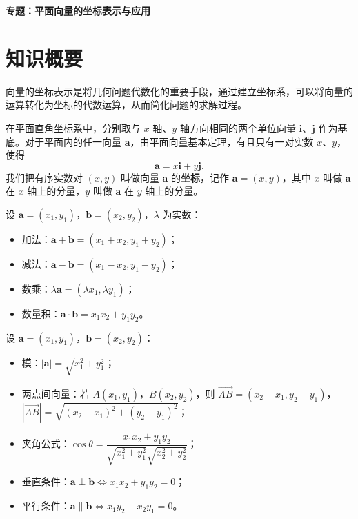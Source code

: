 \documentclass[11pt]{ctexrep}
\begin{document}
\begin{center}
    {\LARGE\bfseries 专题：平面向量的坐标表示与应用}
\end{center}

\section*{知识概要}

向量的坐标表示是将几何问题代数化的重要手段，通过建立坐标系，可以将向量的运算转化为坐标的代数运算，从而简化问题的求解过程。

\begin{definition}[向量的坐标表示]
    在平面直角坐标系中，分别取与 $x$ 轴、$y$ 轴方向相同的两个单位向量 $\boldsymbol{i}$、$\boldsymbol{j}$ 作为基底。对于平面内的任一向量 $\boldsymbol{a}$，由平面向量基本定理，有且只有一对实数 $x$、$y$，使得
    \[
        \boldsymbol{a} = x\boldsymbol{i} + y\boldsymbol{j}.
    \]
    我们把有序实数对 $(x, y)$ 叫做向量 $\boldsymbol{a}$ 的\textbf{坐标}，记作 $\boldsymbol{a} = (x, y)$，其中 $x$ 叫做 $\boldsymbol{a}$ 在 $x$ 轴上的分量，$y$ 叫做 $\boldsymbol{a}$ 在 $y$ 轴上的分量。
\end{definition}

\begin{property}[向量坐标运算]
    设 $\boldsymbol{a} = (x_1, y_1)$，$\boldsymbol{b} = (x_2, y_2)$，$\lambda$ 为实数：
    \begin{itemize}
        \item 加法：$\boldsymbol{a} + \boldsymbol{b} = (x_1+x_2, y_1+y_2)$；
        \item 减法：$\boldsymbol{a} - \boldsymbol{b} = (x_1-x_2, y_1-y_2)$；
        \item 数乘：$\lambda\boldsymbol{a} = (\lambda x_1, \lambda y_1)$；
        \item 数量积：$\boldsymbol{a} \cdot \boldsymbol{b} = x_1x_2 + y_1y_2$。
    \end{itemize}
\end{property}

\begin{property}[向量的模与夹角]
    设 $\boldsymbol{a} = (x_1, y_1)$，$\boldsymbol{b} = (x_2, y_2)$：
    \begin{itemize}
        \item 模：$|\boldsymbol{a}| = \sqrt{x_1^2 + y_1^2}$；
        \item 两点间向量：若 $A(x_1, y_1)$，$B(x_2, y_2)$，则 $\overrightarrow{AB} = (x_2-x_1, y_2-y_1)$，$|\overrightarrow{AB}| = \sqrt{(x_2-x_1)^2 + (y_2-y_1)^2}$；
        \item 夹角公式：$\cos\theta = \dfrac{x_1x_2 + y_1y_2}{\sqrt{x_1^2+y_1^2}\sqrt{x_2^2+y_2^2}}$；
        \item 垂直条件：$\boldsymbol{a} \perp \boldsymbol{b} \Leftrightarrow x_1x_2 + y_1y_2 = 0$；
        \item 平行条件：$\boldsymbol{a} \parallel \boldsymbol{b} \Leftrightarrow x_1y_2 - x_2y_1 = 0$。
    \end{itemize}
\end{property}
\end{document}
